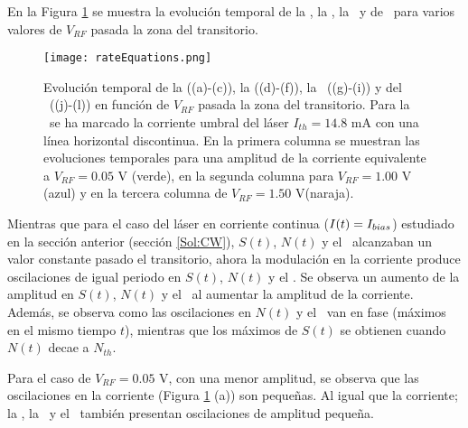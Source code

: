 		En la Figura \ref{Img:rateEquations} se muestra la evolución temporal de la \I, la \s, la \n\ y de \chirp\ para varios valores de $V_{RF}$ pasada la zona del transitorio.

			\begin{figure}[H]
				\centering
				\texttt{[image: rateEquations.png]}
				\caption{\label{Img:rateEquations}Evolución temporal de la \I ((a)-(c)), la \s ((d)-(f)), la \n\ ((g)-(i)) y del \chirp\ ((j)-(l)) en funci\'on de $V_{RF}$ pasada la zona del transitorio. Para la \I\ se ha marcado la corriente umbral del l\'aser $I_{th} = 14.8$ mA con una l\'inea horizontal discontinua. En la primera columna se muestran las evoluciones temporales para una amplitud de la corriente equivalente a $V_{RF} = 0.05$ V (verde), en la segunda columna para $V_{RF} = 1.00$ V (azul) y en la tercera columna de $V_{RF} = 1.50$ V(naraja).}	
			\end{figure}

		Mientras que para el caso del l\'aser en corriente continua ($I(t) = I_{bias}$) estudiado en la secci\'on anterior (secci\'on \ref{Sol:CW}), $S(t)$, $N(t)$ y el \chirp\ alcanzaban un valor constante pasado el transitorio, ahora la modulación en la corriente produce oscilaciones de igual periodo en $S(t)$, $N(t)$ y el \chirp. Se observa un aumento de la amplitud en $S(t)$, $N(t)$ y el \chirp\ al aumentar la amplitud de la corriente. Adem\'as, se observa como las oscilaciones en $N(t)$ y el \chirp\ van en fase (m\'aximos en el mismo tiempo $t$), mientras que los m\'aximos de $S(t)$ se obtienen cuando $N(t)$ decae a $N_{th}$.
			
		Para el caso de $V_{RF} = 0.05$ V, con una menor amplitud, se observa que las oscilaciones en la corriente (Figura \ref{Img:rateEquations} (a)) son pequeñas. Al igual que la corriente; la \s, la \n\ y el \chirp\ tambi\'en presentan oscilaciones de amplitud pequeña.%

